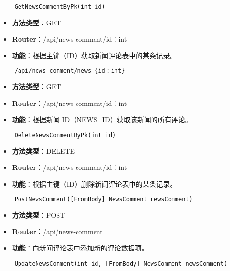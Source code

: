\begin{verbatim}
	GetNewsCommentByPk(int id)
\end{verbatim}

\begin{itemize}
	\item \textbf{方法类型}：GET
	\item \textbf{Router}：/api/news-comment/{id：int}
	\item \textbf{功能}：根据主键（ID）获取新闻评论表中的某条记录。
\end{itemize}

\begin{verbatim}
	/api/news-comment/news-{id：int}
\end{verbatim}

\begin{itemize}
	\item \textbf{方法类型}：GET
	\item \textbf{Router}：/api/news-comment/{id：int}
	\item \textbf{功能}：根据新闻 ID（NEWS\_ID）获取该新闻的所有评论。
\end{itemize}

\begin{verbatim}
	DeleteNewsCommentByPk(int id)
\end{verbatim}

\begin{itemize}
	\item \textbf{方法类型}：DELETE
	\item \textbf{Router}：/api/news-comment/{id：int}
	\item \textbf{功能}：根据主键（ID）删除新闻评论表中的某条记录。
\end{itemize}

\begin{verbatim}
	PostNewsComment([FromBody] NewsComment newsComment)
\end{verbatim}

\begin{itemize}
	\item \textbf{方法类型}：POST
	\item \textbf{Router}：/api/news-comment
	\item \textbf{功能}：向新闻评论表中添加新的评论数据项。
\end{itemize}

\begin{verbatim}
	UpdateNewsComment(int id, [FromBody] NewsComment newsComment)
\end{verbatim}

